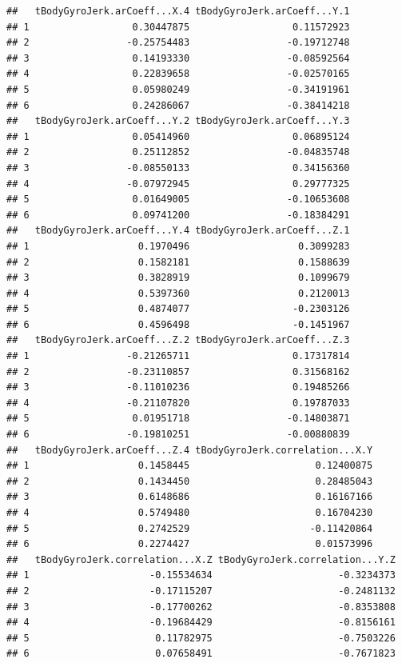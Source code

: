 \documentclass[
]{article}
\begin{document}
\begin{verbatim}
##   tBodyGyroJerk.arCoeff...X.4 tBodyGyroJerk.arCoeff...Y.1
## 1                  0.30447875                  0.11572923
## 2                 -0.25754483                 -0.19712748
## 3                  0.14193330                 -0.08592564
## 4                  0.22839658                 -0.02570165
## 5                  0.05980249                 -0.34191961
## 6                  0.24286067                 -0.38414218
##   tBodyGyroJerk.arCoeff...Y.2 tBodyGyroJerk.arCoeff...Y.3
## 1                  0.05414960                  0.06895124
## 2                  0.25112852                 -0.04835748
## 3                 -0.08550133                  0.34156360
## 4                 -0.07972945                  0.29777325
## 5                  0.01649005                 -0.10653608
## 6                  0.09741200                 -0.18384291
##   tBodyGyroJerk.arCoeff...Y.4 tBodyGyroJerk.arCoeff...Z.1
## 1                   0.1970496                   0.3099283
## 2                   0.1582181                   0.1588639
## 3                   0.3828919                   0.1099679
## 4                   0.5397360                   0.2120013
## 5                   0.4874077                  -0.2303126
## 6                   0.4596498                  -0.1451967
##   tBodyGyroJerk.arCoeff...Z.2 tBodyGyroJerk.arCoeff...Z.3
## 1                 -0.21265711                  0.17317814
## 2                 -0.23110857                  0.31568162
## 3                 -0.11010236                  0.19485266
## 4                 -0.21107820                  0.19787033
## 5                  0.01951718                 -0.14803871
## 6                 -0.19810251                 -0.00880839
##   tBodyGyroJerk.arCoeff...Z.4 tBodyGyroJerk.correlation...X.Y
## 1                   0.1458445                      0.12400875
## 2                   0.1434450                      0.28485043
## 3                   0.6148686                      0.16167166
## 4                   0.5749480                      0.16704230
## 5                   0.2742529                     -0.11420864
## 6                   0.2274427                      0.01573996
##   tBodyGyroJerk.correlation...X.Z tBodyGyroJerk.correlation...Y.Z
## 1                     -0.15534634                      -0.3234373
## 2                     -0.17115207                      -0.2481132
## 3                     -0.17700262                      -0.8353808
## 4                     -0.19684429                      -0.8156161
## 5                      0.11782975                      -0.7503226
## 6                      0.07658491                      -0.7671823

\end{verbatim}
\end{document}
